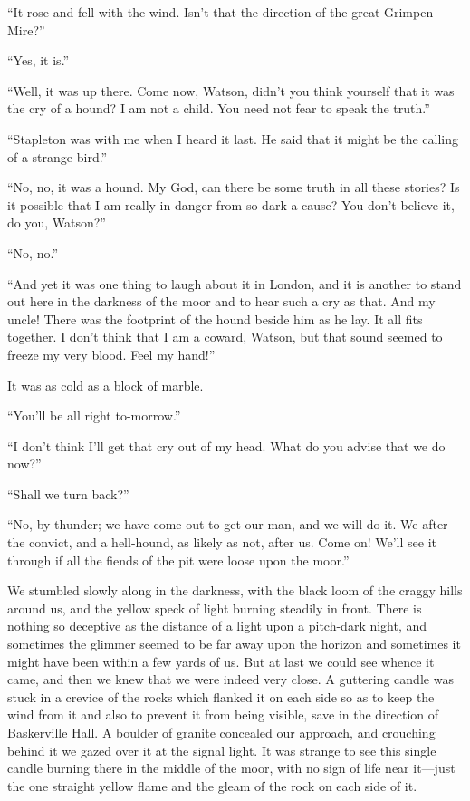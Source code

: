 \documentclass[paper=a5,BCOR=7mm,twoside,DIV=calc,12pt,usegeometry,openany,chapterprefix,endperiod,headings=big]{scrbook} %
\begin{document}
\enquote{It rose and fell with the wind. Isn't that the direction of the great Grimpen Mire?}

\enquote{Yes, it is.}

\enquote{Well, it was up there. Come now, Watson, didn't you think yourself that it was the cry of a hound? I am not a child. You need not fear to speak the truth.}

\enquote{Stapleton was with me when I heard it last. He said that it might be the calling of a strange bird.}

\enquote{No, no, it was a hound. My God, can there be some truth in all these stories? Is it possible that I am really in danger from so dark a cause? You don't believe it, do you, Watson?}

\enquote{No, no.}

\enquote{And yet it was one thing to laugh about it in London, and it is another to stand out here in the darkness of the moor and to hear such a cry as that. And my uncle! There was the footprint of the hound beside him as he lay. It all fits together. I don't think that I am a coward, Watson, but that sound seemed to freeze my very blood. Feel my hand!}

It was as cold as a block of marble.

\enquote{You'll be all right to-morrow.}

\enquote{I don't think I'll get that cry out of my head. What do you advise that we do now?}

\enquote{Shall we turn back?}

\enquote{No, by thunder; we have come out to get our man, and we will do it. We after the convict, and a hell-hound, as likely as not, after us. Come on! We'll see it through if all the fiends of the pit were loose upon the moor.}

We stumbled slowly along in the darkness, with the black loom of the craggy hills around us, and the yellow speck of light burning steadily in front. There is nothing so deceptive as the distance of a light upon a pitch-dark night, and sometimes the glimmer seemed to be far away upon the horizon and sometimes it might have been within a few yards of us. But at last we could see whence it came, and then we knew that we were indeed very close. A guttering candle was stuck in a crevice of the rocks which flanked it on each side so as to keep the wind from it and also to prevent it from being visible, save in the direction of Baskerville Hall. A boulder of granite concealed our approach, and crouching behind it we gazed over it at the signal light. It was strange to see this single candle burning there in the middle of the moor, with no sign of life near it---just the one straight yellow flame and the gleam of the rock on each side of it.
\end{document}
